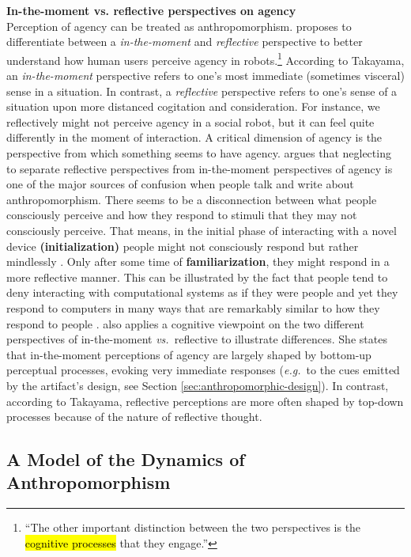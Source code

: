 \documentclass{frontiersSCNS} %
\newcommand{\eg}{{\textit{e.g.~}}}
\newcommand{\vs}{{\textit{vs.~}}}
\begin{document}
\textbf{In-the-moment vs. reflective perspectives on agency}\\
Perception of agency can be treated as anthropomorphism.
\citep{takayama_perspectives_2012} proposes to differentiate between a \textit{in-the-moment} and \textit{reflective} perspective to better understand how human users perceive agency in robots.\footnote{``The other important distinction between the two perspectives is the \hl{cognitive processes} that they engage.''} According to Takayama, an \textit{in-the-moment} perspective refers to one's most immediate (sometimes visceral) sense in a situation. In contrast, a \textit{reflective} perspective refers to one's sense of a situation upon more distanced cogitation and consideration. For instance, we reflectively might not perceive agency in a social robot, but it can feel quite differently in the moment of interaction. A critical dimension of agency is the perspective from which something seems to have agency. \cite{takayama_perspectives_2012} argues that neglecting to separate reflective perspectives from in-the-moment perspectives of agency is one of the major sources of confusion when people talk and write about anthropomorphism. There seems to be a disconnection between what people consciously perceive and how they respond to stimuli that they may not consciously perceive.
That means, in the initial phase of interacting with a novel device \textbf{(initialization)} people might not consciously respond but rather mindlessly \citep{nass_machines_2000}. Only after some time of \textbf{familiarization}, they might respond in a more reflective manner. This can be illustrated by the fact that people tend to deny interacting with computational systems as if they were people and yet they respond to computers in many ways that are remarkably similar to how they respond to people \citep{reeves_media_1996}.
\cite{takayama_perspectives_2012} also applies a cognitive viewpoint on the two different perspectives of in-the-moment \vs reflective to illustrate differences. She states that in-the-moment perceptions of agency are largely shaped by bottom-up perceptual processes, evoking very immediate responses (\eg to the cues emitted by the artifact's design, see Section \ref{sec:anthropomorphic-design}).
In contrast, according to Takayama, reflective perceptions are more often shaped by top-down processes because of the nature of reflective thought.



\subsection{A Model of the Dynamics of Anthropomorphism}
\label{sec:dynamics-model}
\end{document}

